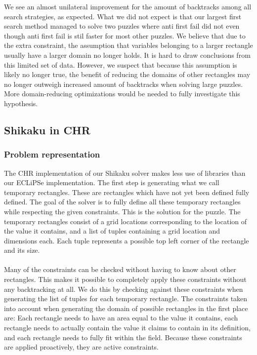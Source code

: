 We see an almost unilateral improvement for the amount of backtracks among all search strategies, as expected. What we did not expect is that our largest first search method managed to solve  two puzzles where anti first fail did not even though anti first fail is stil faster for most other puzzles. We believe that due to the extra constraint, the assumption that variables belonging to a larger rectangle usually have a larger domain no longer holds. It is hard to draw conclusions from this limited set of data. However, we suspect that because this assumption is likely no longer true, the benefit of reducing the domains of other rectangles may no longer outweigh increased amount of backtracks when solving large puzzles. More domain-reducing optimizations would be needed to fully investigate this hypothesis. 
\newpage
\subsection{Shikaku in CHR}
\subsubsection{Problem representation}
The CHR implementation of our Shikaku solver makes less use of libraries than our ECLiPSe implementation. The first step is generating what we call temporary rectangles. These are rectangles which have not yet been defined fully defined. The goal of the solver is to fully define all these temporary rectangles while respecting the given constraints. This is the solution for the puzzle. The temporary rectangles consist of a grid locations corresponding to the location of the value it contains, and a list of tuples containing a grid location and dimensions each. Each tuple represents a possible top left corner of the rectangle and its size. 
\\ \\
Many of the constraints can be checked without having to know about other rectangles. This makes it possible to completely apply these constraints without any backtracking at all. We do this by checking against these constraints when generating the list of tuples for each temporary rectangle. The constraints taken into account when generating the domain of possible rectangles in the first place are: Each rectangle needs to have an area equal to the value it contains, each rectangle needs to actually contain the value it claims to contain in its definition, and each rectangle needs to fully fit within the field. Because these constraints are applied proactively, they are active constraints.

